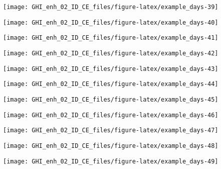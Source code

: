 \documentclass[
  10pt,
  a4paper,oneside]{article}
\begin{document}
\begin{center}\texttt{[image: GHI\_enh\_02\_ID\_CE\_files/figure-latex/example\_days-39]} \end{center}

\begin{center}\texttt{[image: GHI\_enh\_02\_ID\_CE\_files/figure-latex/example\_days-40]} \end{center}

\begin{center}\texttt{[image: GHI\_enh\_02\_ID\_CE\_files/figure-latex/example\_days-41]} \end{center}

\begin{center}\texttt{[image: GHI\_enh\_02\_ID\_CE\_files/figure-latex/example\_days-42]} \end{center}

\begin{center}\texttt{[image: GHI\_enh\_02\_ID\_CE\_files/figure-latex/example\_days-43]} \end{center}

\begin{center}\texttt{[image: GHI\_enh\_02\_ID\_CE\_files/figure-latex/example\_days-44]} \end{center}

\begin{center}\texttt{[image: GHI\_enh\_02\_ID\_CE\_files/figure-latex/example\_days-45]} \end{center}

\begin{center}\texttt{[image: GHI\_enh\_02\_ID\_CE\_files/figure-latex/example\_days-46]} \end{center}

\begin{center}\texttt{[image: GHI\_enh\_02\_ID\_CE\_files/figure-latex/example\_days-47]} \end{center}

\begin{center}\texttt{[image: GHI\_enh\_02\_ID\_CE\_files/figure-latex/example\_days-48]} \end{center}

\begin{center}\texttt{[image: GHI\_enh\_02\_ID\_CE\_files/figure-latex/example\_days-49]} \end{center}
\end{document}
